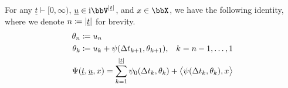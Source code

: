 \begin{proposition}
  \label{proposition:aff-fdds-complex}
  For any $\underline t \vdash [0,\infty)$, $\underline\momentVar \in \im\vecSpace^{|\underline t|}$, and $\stateVar \in \stateSpace$, we have the following identity, where we denote $n \coloneqq |\underline t|$ for brevity.
  \begin{gather*}
    \begin{aligned}
      \theta_n &\coloneqq u_n \\
      \theta_k &\coloneqq u_k + \psi(\Delta t_{k+1}, \theta_{k+1}), & k = n-1, \ldots, 1 
    \end{aligned} \\
    \Psi(\underline t, \underline{u}, x) = \sum_{k=1}^{|\underline t|} \psi_0(\Delta t_k, \theta_k) + {\big\langle \psi(\Delta t_k, \theta_k) , x \big\rangle}
  \end{gather*}
\end{proposition}
